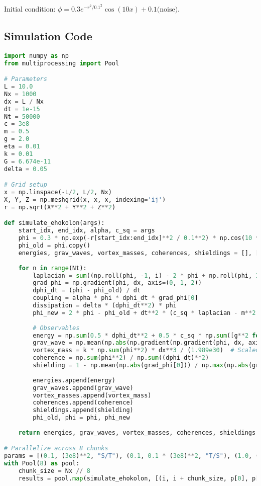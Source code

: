 \documentclass[11pt]{article}
\begin{document}
Initial condition: \(\phi = 0.3 e^{-r^2/0.1^2} \cos(10x) + 0.1 \text{(noise)}\).

\subsection{Simulation Code}
\begin{lstlisting}[language=Python, caption={Fluxonic Zero-Point Energy and Gravity Simulation}, label=lst:simulation]
import numpy as np
from multiprocessing import Pool

# Parameters
L = 10.0
Nx = 1000
dx = L / Nx
dt = 1e-15
Nt = 50000
c = 3e8
m = 0.5
g = 2.0
eta = 0.01
k = 0.01
G = 6.674e-11
delta = 0.05

# Grid setup
x = np.linspace(-L/2, L/2, Nx)
X, Y, Z = np.meshgrid(x, x, x, indexing='ij')
r = np.sqrt(X**2 + Y**2 + Z**2)

def simulate_ehokolon(args):
    start_idx, end_idx, alpha, c_sq = args
    phi = 0.3 * np.exp(-r[start_idx:end_idx]**2 / 0.1**2) * np.cos(10 * X[start_idx:end_idx]) + 0.1 * np.random.rand(Nx//8, Nx, Nx)
    phi_old = phi.copy()
    energies, grav_waves, vortex_masses, coherences, shieldings = [], [], [], [], []
    
    for n in range(Nt):
        laplacian = sum((np.roll(phi, -1, i) - 2 * phi + np.roll(phi, 1, i)) / dx**2 for i in range(3))
        grad_phi = np.gradient(phi, dx, axis=(0, 1, 2))
        dphi_dt = (phi - phi_old) / dt
        coupling = alpha * phi * dphi_dt * grad_phi[0]
        dissipation = delta * (dphi_dt**2) * phi
        phi_new = 2 * phi - phi_old + dt**2 * (c_sq * laplacian - m**2 * phi - g * phi**3 - eta * phi**5 + 8 * np.pi * G * k * phi**2 + coupling - dissipation)
        
        # Observables
        energy = np.sum(0.5 * dphi_dt**2 + 0.5 * c_sq * np.sum([g**2 for g in grad_phi], axis=0) + 0.5 * m**2 * phi**2 + 0.25 * g * phi**4 + (1/6) * eta * phi**6) * dx**3
        grav_wave = np.mean(np.abs(np.gradient(np.gradient(phi, dx, axis=0), dx, axis=0)))
        vortex_mass = k * np.sum(phi**2) * dx**3 / (1.989e30)  # Scaled to solar masses
        coherence = np.sum(phi**2) / np.sum((dphi_dt)**2)
        shielding = 1 - np.mean(np.abs(grad_phi[0])) / np.max(np.abs(grad_phi[0]))
        
        energies.append(energy)
        grav_waves.append(grav_wave)
        vortex_masses.append(vortex_mass)
        coherences.append(coherence)
        shieldings.append(shielding)
        phi_old, phi = phi, phi_new
    
    return energies, grav_waves, vortex_masses, coherences, shieldings

# Parallelize across 8 chunks
params = [(0.1, (3e8)**2, "S/T"), (0.1, 0.1 * (3e8)**2, "T/S"), (1.0, (3e8)**2, "S=T")]
with Pool(8) as pool:
    chunk_size = Nx // 8
    results = pool.map(simulate_ehokolon, [(i, i + chunk_size, p[0], p[1]) for i in range(0, Nx, chunk_size) for p in params])
\end{lstlisting}
\end{document}
